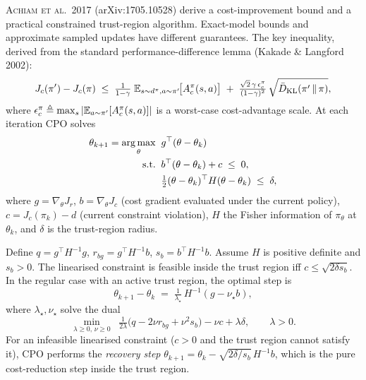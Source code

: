 \documentclass[11pt,oneside]{scrbook}
\begin{document}
\textsc{Achiam et al.\ 2017} (arXiv:1705.10528) derive a cost-improvement bound and a practical constrained trust-region algorithm. Exact-model bounds and approximate sampled updates have different guarantees. The key
inequality, derived from the standard performance-difference lemma (Kakade \&
Langford 2002):
\begin{equation}\label{eq:cpo-bound}
   J_c(\pi') - J_c(\pi) \;\leq\;
   \tfrac{1}{1-\gamma}\; \mathbb{E}_{s \sim d^\pi, a \sim \pi'}\!\bigl[ A_c^\pi(s,a) \bigr]
   \;+\; \tfrac{\sqrt{2}\, \gamma\, \epsilon_c^\pi}{(1-\gamma)^2}\, \sqrt{\bar D_{\mathrm{KL}}(\pi' \,\Vert\, \pi)},
\end{equation}
where $\epsilon_c^\pi \triangleq \max_s |\mathbb{E}_{a\sim\pi'}[A_c^\pi(s,a)]|$ is a worst-case
cost-advantage scale. At each iteration CPO solves
\begin{equation}\label{eq:cpo-qp}
\begin{aligned}
  \theta_{k+1} = \operatorname*{arg\,max}_\theta\;\; & g^\top (\theta - \theta_k) \\
  \text{s.t.}\;\; & b^\top (\theta - \theta_k) + c \;\leq\; 0, \\
  & \tfrac{1}{2} (\theta - \theta_k)^\top H (\theta - \theta_k) \;\leq\; \delta,
\end{aligned}
\end{equation}
where $g = \nabla_\theta J_r$, $b = \nabla_\theta J_c$ (cost gradient
evaluated under the current policy), $c = J_c(\pi_k) - d$ (current
constraint violation), $H$ the Fisher information of $\pi_\theta$ at
$\theta_k$, and $\delta$ is the trust-region radius.

\begin{theorem}\label{thm:cpo}
Define $q = g^\top H^{-1} g$, $r_{bg} = g^\top H^{-1} b$, $s_b = b^\top H^{-1} b$.
Assume $H$ is positive definite and $s_b>0$. The linearised constraint is feasible inside the trust region iff $c\le\sqrt{2\delta s_b}$. In the regular case with an active trust region, the optimal step is
\[
   \theta_{k+1} - \theta_k \;=\; \tfrac{1}{\lambda_\star}\, H^{-1} (g - \nu_\star b),
\]
where $\lambda_\star, \nu_\star$ solve the dual
\[
   \min_{\lambda \geq 0,\, \nu \geq 0} \;\; \tfrac{1}{2\lambda}\bigl(q - 2 \nu r_{bg} + \nu^2 s_b\bigr) - \nu c + \lambda \delta,\qquad\lambda>0.
\]
For an infeasible linearised constraint ($c > 0$ and the trust region cannot
satisfy it), CPO performs the \emph{recovery step}
$\theta_{k+1} = \theta_k - \sqrt{2\delta/s_b}\, H^{-1} b$, which is the
pure cost-reduction step inside the trust region.
\end{theorem}
\end{document}
